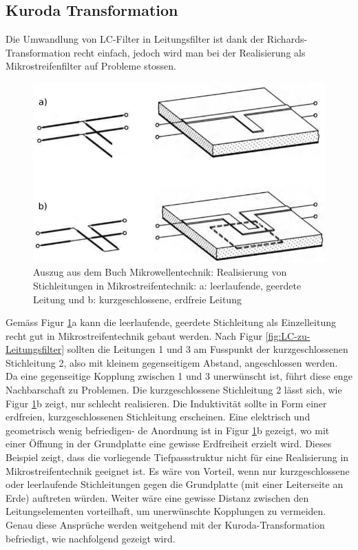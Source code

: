 \subsection{Kuroda Transformation}

Die   Umwandlung   von   LC-Filter   in   Leitungsfilter    ist    dank    der
Richards-Transformation recht einfach, jedoch  wird  man  bei der Realisierung
als Mikrostreifenfilter auf Probleme stossen.

\begin{figure}[h!]
    \centering
    \includegraphics[width=\imagewidth]{images/mikrostreifen}
    \caption{Auszug aus dem Buch Mikrowellentechnik\cite[p.~27]{ref:baechold}: Realisierung von Stichleitungen in Mikrostreifentechnik: a: leerlaufende, geerdete Leitung und b: kurzgeschlossene, erdfreie Leitung}
    \label{fig:mikrostreifen}
\end{figure}

Gem\"ass  Figur   \ref{fig:mikrostreifen}a  kann  die  leerlaufende,  geerdete
Stichleitung  als  Einzelleitung  recht  gut  in  Mikrostreifentechnik  gebaut
werden. Nach  Figur \ref{fig:LC-zu-Leitungsfilter} sollten die Leitungen 1 und
3  am  Fusspunkt  der  kurzgeschlossenen  Stichleitung  2,  also  mit  kleinem
gegenseitigem  Abstand,  angeschlossen  werden. Da eine gegenseitige  Kopplung
zwischen  1 und 3 unerw\"unscht  ist,  f\"uhrt  diese  enge  Nachbarschaft  zu
Problemen.  Die  kurzgeschlossene  Stichleitung  2  l\"asst  sich,  wie  Figur
\ref{fig:mikrostreifen}b zeigt,  nur  schlecht realisieren. Die Induktivit\"at
sollte  in Form einer erdfreien,  kurzgeschlossenen  Stichleitung  erscheinen.
Eine elektrisch und geometrisch wenig befriedigen-  de  Anordnung ist in Figur
\ref{fig:mikrostreifen}b gezeigt, wo mit einer  \"Offnung  in  der Grundplatte
eine  gewisse  Erdfreiheit  erzielt  wird.  Dieses  Beispiel  zeigt,  dass die
vorliegende    Tiefpassstruktur    nicht   f\"ur    eine    Realisierung    in
Mikrostreifentechnik   geeignet  ist.  Es  w\"are  von   Vorteil,   wenn   nur
kurzgeschlossene oder leerlaufende  Stichleitungen  gegen die Grundplatte (mit
einer  Leiterseite an Erde) auftreten w\"urden.  Weiter  w\"are  eine  gewisse
Distanz  zwischen  den  Leitungselementen   vorteilhaft,   um   unerw\"unschte
Kopplungen  zu  vermeiden.  Genau  diese Anspr\"uche werden weitgehend mit der
Kuroda-Transformation    befriedigt,    wie    nachfolgend    gezeigt    wird.

